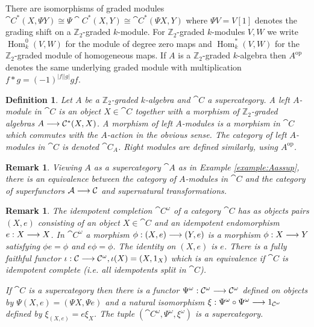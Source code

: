 \documentclass[english,letter paper,12pt,leqno]{article}
\theoremstyle{example}
\newtheorem{definition}[theorem]{Definition}
\newtheorem{remark}[theorem]{Remark}
\numberwithin{equation}{section}
\def\Hom{\operatorname{Hom}}
\begin{document}
There are isomorphisms of graded modules $\cat{C}^*(X, \Psi Y) \cong \Psi \cat{C}^*(X, Y) \cong \cat{C}^*(\Psi X, Y)$ where $\Psi V = V [1]$ denotes the grading shift on a $\mathbb{Z}_2$-graded $k$-module. For $\mathbb{Z}_2$-graded $k$-modules $V,W$ we write $\Hom^0_k(V, W)$ for the module of degree zero maps and $\Hom_k^*(V, W)$ for the $\mathbb{Z}_2$-graded module of homogeneous maps. If $A$ is a $\mathbb{Z}_2$-graded $k$-algebra then $A^{\operatorname{op}}$ denotes the same underlying graded module with multiplication $f * g = (-1)^{|f||g|} gf$.

\begin{definition} Let $A$ be a $\mathbb{Z}_2$-graded $k$-algebra and $\cat{C}$ a supercategory. A \emph{left $A$-module in $\cat{C}$} is an object $X \in \cat{C}$ together with a morphism of $\mathbb{Z}_2$-graded algebras $A \longrightarrow \mathcal{C}^*(X,X)$. A \emph{morphism} of left $A$-modules is a morphism in $\cat{C}$ which commutes with the $A$-action in the obvious sense. The category of left $A$-modules in $\cat{C}$ is denoted $\cat{C}_A$. Right modules are defined similarly, using $A^{\operatorname{op}}$.
\end{definition}

\begin{remark}\label{remark:supercat_idempcomp} Viewing $A$ as a supercategory $\cat{A}$ as in Example \ref{example:Aassup}, there is an equivalence between the category of $A$-modules in $\cat{C}$ and the category of superfunctors $\mathcal{A} \longrightarrow \mathcal{C}$ and supernatural transformations.
\end{remark}

\begin{remark}\label{remark:idempotent_completion} The \emph{idempotent completion} $\cat{C}^\omega$ of a category $\cat{C}$ has as objects pairs $(X,e)$ consisting of an object $X \in \cat{C}$ and an idempotent endomorphism $e: X \longrightarrow X$. In $\cat{C}^\omega$ a morphism $\phi: (X,e) \longrightarrow (Y,e)$ is a morphism $\phi: X \longrightarrow Y$ satisfying $\phi e = \phi$ and $e \phi = \phi$. The identity on $(X,e)$ is $e$. There is a fully faithful functor $\iota: \mathcal{C} \longrightarrow \mathcal{C}^{\omega}, \iota(X) = (X,1_X)$ which is an equivalence if $\cat{C}$ is idempotent complete (i.e. all idempotents split in $\cat{C}$).

If $\cat{C}$ is a supercategory then there is a functor $\Psi^\omega: \mathcal{C}^\omega \longrightarrow \mathcal{C}^\omega$ defined on objects by $\Psi(X,e) = (\Psi X, \Psi e)$ and a natural isomorphism $\xi: \Psi^\omega \circ \Psi^\omega \longrightarrow 1_{\mathcal{C}^\omega}$ defined by $\xi_{(X,e)} = e \xi_X$. The tuple $(\cat{C}^\omega, \Psi^\omega, \xi^\omega)$ is a supercategory.
\end{remark}
\end{document}
